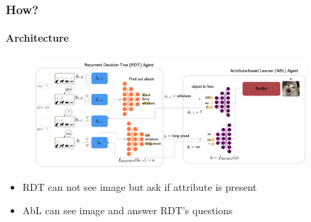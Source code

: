 \documentclass[9pt]{beamer}
\begin{document}
\begin{frame}
\frametitle{How?}
\framesubtitle{Architecture}
\begin{figure}
	\centering
	\includegraphics[width=0.9\textwidth]{images/uncertaintRDTC.pdf} 
	\label{fig:uncertainRDTC}
\end{figure}
\begin{itemize}
	\item RDT can not see image but ask if attribute is present
	\item AbL can see image and answer RDT's questions
\end{itemize}
\end{frame} 





\end{document}
